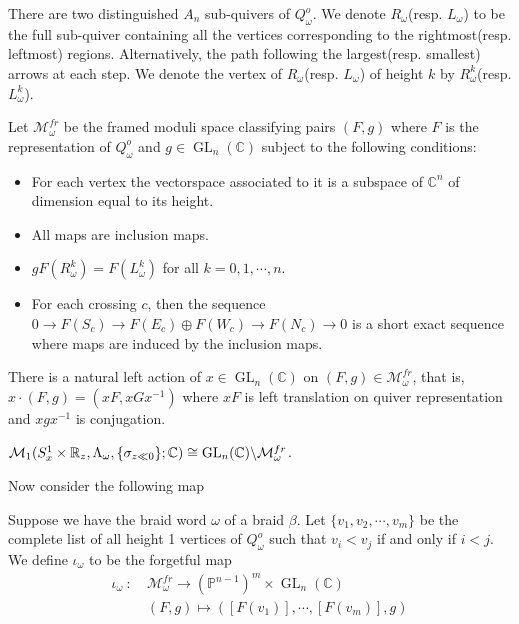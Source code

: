 \begin{definition}
	 There are two distinguished $A_n$ sub-quivers of $Q^o_{\omega}$. We denote $R_{\omega}$(resp. $L_{\omega}$) to be the full sub-quiver containing all the vertices corresponding to the rightmost(resp. leftmost) regions. Alternatively, the path following the largest(resp. smallest) arrows at each step. We denote the vertex of $R_{\omega}$(resp. $L_{\omega}$) of height $k$ by $R^k_{\omega}$(resp. $L^k_{\omega}$).
\end{definition}

\begin{definition}
	Let $\mathcal{M}^{fr}_{\omega}$ be the framed moduli space classifying pairs $(F,g)$ where $F$ is the representation of $Q^o_{\omega}$ and $g\in \operatorname{GL}_n(\mathbb{C})$ subject to the following conditions:
	\begin{itemize}
		\item For each vertex the vectorspace associated to it is a subspace of $\mathbb{C}^n$ of dimension equal to its height.
		\item  All maps are inclusion maps.
		\item  $gF(R^k_{\omega})=F(L^k_{\omega})$ for all $k=0,1,\cdots, n$.
		\item For each crossing $c$, then the sequence $0\rightarrow F(S_c)\rightarrow F(E_c)\oplus F(W_c)\rightarrow F(N_c)\rightarrow 0$ is a short exact sequence where maps are induced by the inclusion maps.
	\end{itemize}
\end{definition}

\begin{remark}
	There is a natural left action of $x\in \operatorname{GL}_n(\mathbb{C})$ on $(F,g)\in\mathcal{M}^{fr}_{\omega}$, that is, $x\cdot(F,g)=(xF,xGx^{-1})$ where $xF$ is left translation on quiver representation and $xgx^{-1}$ is conjugation.
\end{remark}

\begin{theorem}
\cite[Prop.~1.5]{shende2017legendrian} $\mathcal{M}_1(S^1_x \times \mathbb{R}_z,\Lambda_\omega,\{\sigma_{z\ll 0}\};\mathbb{C})\cong \operatorname{GL}_n(\mathbb{C})\backslash \mathcal{M}^{fr}_{\omega}$.
\end{theorem}

Now consider the following map
\begin{definition}
Suppose we have the braid word $\omega$ of a braid $\beta$. Let $\{v_1,v_2,\cdots,v_m\}$ be the complete list of all height 1 vertices of $Q^o_{\omega}$ such that $v_i<v_j$ if and only if $i<j$. We define $\iota_\omega$ to be the  forgetful map 
\begin{align*}
\iota_{\omega}~:~ &\mathcal{M}^{fr}_{\omega}\rightarrow(\mathbb{P}^{n-1})^m\times \operatorname{GL}_n(\mathbb{C})\\
& (F,g) \mapsto ([F(v_1)],\cdots,[F(v_m)], g)
\end{align*}
\end{definition}

